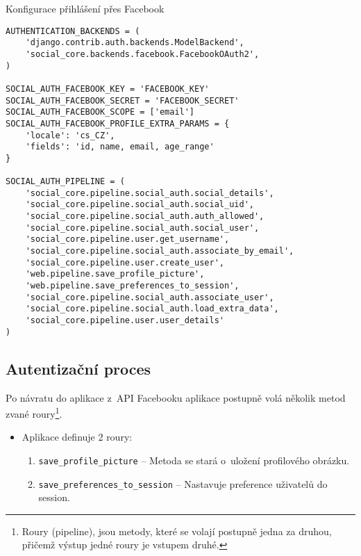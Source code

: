 \begin{listing}[h]
\caption{\label{code:facebook-settings}Konfigurace přihlášení přes Facebook}
\begin{verbatim}
AUTHENTICATION_BACKENDS = (
    'django.contrib.auth.backends.ModelBackend',
    'social_core.backends.facebook.FacebookOAuth2',
)

SOCIAL_AUTH_FACEBOOK_KEY = 'FACEBOOK_KEY'
SOCIAL_AUTH_FACEBOOK_SECRET = 'FACEBOOK_SECRET'
SOCIAL_AUTH_FACEBOOK_SCOPE = ['email']
SOCIAL_AUTH_FACEBOOK_PROFILE_EXTRA_PARAMS = {
    'locale': 'cs_CZ',
    'fields': 'id, name, email, age_range'
}

SOCIAL_AUTH_PIPELINE = (
    'social_core.pipeline.social_auth.social_details',
    'social_core.pipeline.social_auth.social_uid',
    'social_core.pipeline.social_auth.auth_allowed',
    'social_core.pipeline.social_auth.social_user',
    'social_core.pipeline.user.get_username',
    'social_core.pipeline.social_auth.associate_by_email',
    'social_core.pipeline.user.create_user',
    'web.pipeline.save_profile_picture',
    'web.pipeline.save_preferences_to_session',
    'social_core.pipeline.social_auth.associate_user',
    'social_core.pipeline.social_auth.load_extra_data',
    'social_core.pipeline.user.user_details'
)
\end{verbatim}
\end{listing}

\subsection{Autentizační proces}
Po návratu do aplikace z~API Facebooku aplikace postupně volá několik metod zvané roury\footnote{Roury (pipeline), jsou metody, které se volají postupně jedna za druhou, přičemž výstup jedné roury je vstupem druhé.}.
\begin{itemize}
    \item Aplikace definuje 2 roury:
    \begin{enumerate}
        \item \texttt{save\_profile\_picture} -- Metoda se stará o~uložení profilového obrázku.
        \item \texttt{save\_preferences\_to\_session} -- Nastavuje preference uživatelů do session.
    \end{enumerate}
\end{itemize}
